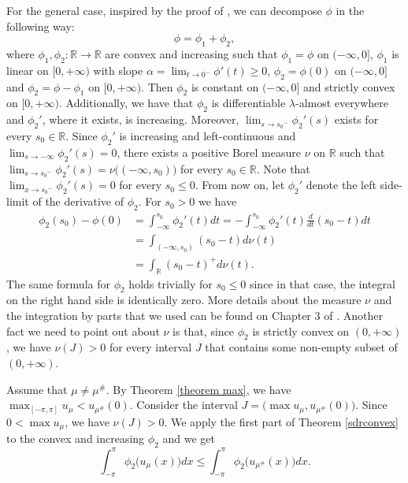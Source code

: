 \documentclass[11pt]{amsart}
\numberwithin{equation}{section}
\begin{document}
\par For the general case, inspired by the proof of \cite[Proposition 3]{Baernstein1974}, we can decompose \(\phi\) in the following way:
\[\phi=\phi_1+\phi_2,\]
where \(\phi_1,\phi_2:\mathbb{R}\to\mathbb{R}\) are convex and increasing such that \(\phi_1=\phi\) on \((-\infty,0]\), \(\phi_1\) is linear on \([0,+\infty)\) with slope \(\alpha=\displaystyle\lim_{t\to0^-}\phi'(t)\geq0\), \(\phi_2=\phi(0)\) on \((-\infty,0]\) and \(\phi_2=\phi-\phi_1\) on \([0,+\infty)\). Then \(\phi_2\) is constant on \((-\infty,0]\) and strictly convex on \([0,+\infty).\) Additionally, we have that \(\phi_2\) is differentiable \(\lambda\)-almost everywhere and \(\phi_2'\), where it exists, is increasing. Moreover, \(\displaystyle\lim_{s\to{s_0}^-}\phi_2'(s)\) exists for every \(s_0\in \mathbb{R}\). Since \(\phi_2'\) is increasing and left-continuous and \(\displaystyle\lim_{s\to-\infty}\phi_2'(s)=0\), there exists a positive Borel measure \(\nu\) on \(\mathbb{R}\) such that \(\displaystyle\lim_{s\to{s_0}^-}\phi_2'(s)=\nu\bigl((-\infty,s_0)\bigr)\) for every \(s_0\in\mathbb{R}\). Note that \(\displaystyle\lim_{x\to{s_0}^-}\phi_2'(s)=0\) for every \(s_0\leq0\). From now on, let \(\phi_2'\) denote the left side-limit of the derivative of \(\phi_2\). For \(s_0>0\) we have
\begin{align}\label{representation phi 2}
\phi_2(s_0)-\phi(0)&=\int_{-\infty}^{s_0} \phi_2'(t)dt=-\int_{-\infty}^{s_0} \phi_2'(t)\frac{d}{dt}(s_0-t)dt\\
\nonumber&=\int_{(-\infty,s_0)}(s_0-t)d\nu(t)\\
\nonumber&=\int_\mathbb{R}(s_0-t)^+d\nu(t).
\end{align}
The same formula for \(\phi_2\) holds trivially for \(s_0\leq0\) since in that case, the integral on the right hand side is identically zero. More details about the measure \(\nu\) and the integration by parts that we used can be found on Chapter 3 of \cite{Folland}. Another fact we need to point out about \(\nu\) is that, since \(\phi_2\) is strictly convex on \((0,+\infty)\), we have \(\nu(J)>0\) for every interval \(J\) that contains some non-empty subset of \((0,+\infty)\).
\par Assume that \(\mu\neq\mu^\#\). By Theorem \ref{theorem max}, we have \(\displaystyle\max_{[-\pi,\pi]}u_\mu<u_{\mu^\#}(0)\). Consider the interval \(J=\bigl(\max u_\mu,u_{\mu^\#}(0)\bigr)\). Since \(0<\max u_\mu\), we have \(\nu(J)>0\). We apply the first part of Theorem \ref{sdrconvex} to the convex and increasing \(\phi_2\) and we get 
\begin{equation}\label{convex phi2}
\int_{-\pi}^\pi \phi_2\bigl(u_\mu(x)\bigr)dx\leq\int_{-\pi}^\pi \phi_2\bigl(u_{\mu^\#}(x)\bigr)dx.
\end{equation}
\end{document}
